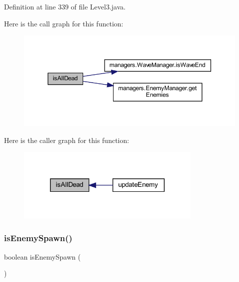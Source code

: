 Definition at line 339 of file Level3.\+java.

Here is the call graph for this function\+:\nopagebreak
\begin{figure}[H]
\begin{center}
\leavevmode
\includegraphics[width=350pt]{classscenes_1_1_level3_acd1846d50c3d8678777f9ab6716f5cf3_cgraph}
\end{center}
\end{figure}
Here is the caller graph for this function\+:\nopagebreak
\begin{figure}[H]
\begin{center}
\leavevmode
\includegraphics[width=251pt]{classscenes_1_1_level3_acd1846d50c3d8678777f9ab6716f5cf3_icgraph}
\end{center}
\end{figure}
\mbox{\label{classscenes_1_1_level3_a121827ebd1c5b24c92f966721b51c0b9}} 
\subsubsection{\texorpdfstring{is\+Enemy\+Spawn()}{isEnemySpawn()}}
{\footnotesize\ttfamily boolean is\+Enemy\+Spawn (\begin{DoxyParamCaption}{ }\end{DoxyParamCaption})\hspace{0.3cm}{\ttfamily [private]}}



